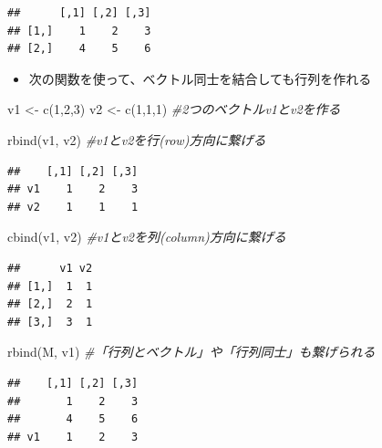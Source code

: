 \documentclass[
]{book}
\newenvironment{Shaded}{\begin{snugshade}}{\end{snugshade}}
\newcommand{\CommentTok}[1]{\textcolor[rgb]{0.56,0.35,0.01}{\textit{#1}}}
\newcommand{\DecValTok}[1]{\textcolor[rgb]{0.00,0.00,0.81}{#1}}
\newcommand{\FunctionTok}[1]{\textcolor[rgb]{0.00,0.00,0.00}{#1}}
\newcommand{\NormalTok}[1]{#1}
\newcommand{\OtherTok}[1]{\textcolor[rgb]{0.56,0.35,0.01}{#1}}
\providecommand{\tightlist}{%
  \setlength{\itemsep}{0pt}\setlength{\parskip}{0pt}}
\begin{document}
\begin{verbatim}
##      [,1] [,2] [,3]
## [1,]    1    2    3
## [2,]    4    5    6
\end{verbatim}

\begin{itemize}
\tightlist
\item
  次の関数を使って、ベクトル同士を結合しても行列を作れる
\end{itemize}

\begin{Shaded}
\begin{Highlighting}[]
\NormalTok{v1 }\OtherTok{\textless{}{-}} \FunctionTok{c}\NormalTok{(}\DecValTok{1}\NormalTok{,}\DecValTok{2}\NormalTok{,}\DecValTok{3}\NormalTok{) }
\NormalTok{v2 }\OtherTok{\textless{}{-}} \FunctionTok{c}\NormalTok{(}\DecValTok{1}\NormalTok{,}\DecValTok{1}\NormalTok{,}\DecValTok{1}\NormalTok{) }\CommentTok{\#2つのベクトルv1とv2を作る}

\FunctionTok{rbind}\NormalTok{(v1, v2) }\CommentTok{\#v1とv2を行(row)方向に繋げる}
\end{Highlighting}
\end{Shaded}

\begin{verbatim}
##    [,1] [,2] [,3]
## v1    1    2    3
## v2    1    1    1
\end{verbatim}

\begin{Shaded}
\begin{Highlighting}[]
\FunctionTok{cbind}\NormalTok{(v1, v2) }\CommentTok{\#v1とv2を列(column)方向に繋げる}
\end{Highlighting}
\end{Shaded}

\begin{verbatim}
##      v1 v2
## [1,]  1  1
## [2,]  2  1
## [3,]  3  1
\end{verbatim}

\begin{Shaded}
\begin{Highlighting}[]
\FunctionTok{rbind}\NormalTok{(M, v1) }\CommentTok{\#「行列とベクトル」や「行列同士」も繋げられる}
\end{Highlighting}
\end{Shaded}

\begin{verbatim}
##    [,1] [,2] [,3]
##       1    2    3
##       4    5    6
## v1    1    2    3
\end{verbatim}
\end{document}
